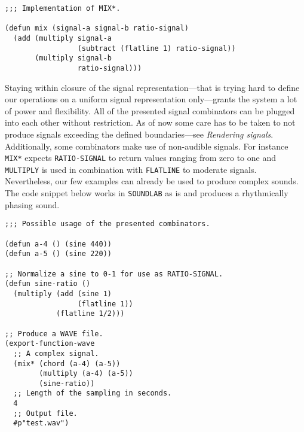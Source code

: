 \begin{verbatim}
;;; Implementation of MIX*.

(defun mix (signal-a signal-b ratio-signal)
  (add (multiply signal-a
                 (subtract (flatline 1) ratio-signal))
       (multiply signal-b
                 ratio-signal)))
\end{verbatim}

Staying within closure of the signal representation---that is trying
hard to define our operations on a uniform signal representation
only---grants the system a lot of power and flexibility. All of the
presented signal combinators can be plugged into each other without
restriction. As of now some care has to be taken to not produce signals
exceeding the defined boundaries---see \textit{Rendering signals}.
Additionally, some combinators make use of non-audible signals. For
instance \texttt{MIX*} expects \texttt{RATIO-SIGNAL} to return values
ranging from zero to one and \texttt{MULTIPLY} is used in combination
with \texttt{FLATLINE} to moderate signals. Nevertheless, our few
examples can already be used to produce complex sounds. The code snippet
below works in \texttt{SOUNDLAB} as is and produces a rhythmically phasing
sound.

\begin{verbatim}
;;; Possible usage of the presented combinators.

(defun a-4 () (sine 440))
(defun a-5 () (sine 220))

;; Normalize a sine to 0-1 for use as RATIO-SIGNAL.
(defun sine-ratio ()
  (multiply (add (sine 1)
                 (flatline 1))
            (flatline 1/2)))

;; Produce a WAVE file.
(export-function-wave
  ;; A complex signal.
  (mix* (chord (a-4) (a-5))
        (multiply (a-4) (a-5))
        (sine-ratio))
  ;; Length of the sampling in seconds.
  4
  ;; Output file.
  #p"test.wav")
\end{verbatim}
